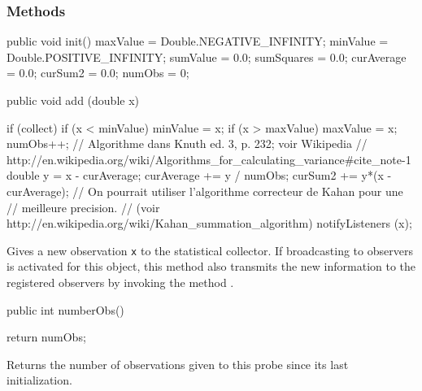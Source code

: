 \subsubsection* {Methods}
\begin{code}\begin{hide}

   public void init() {
       maxValue = Double.NEGATIVE_INFINITY;
       minValue = Double.POSITIVE_INFINITY;
       sumValue = 0.0;
       sumSquares = 0.0;
       curAverage = 0.0;
       curSum2 = 0.0;
       numObs = 0;
   }\end{hide}

   public void add (double x) \begin{hide} {
      if (collect) {
         if (x < minValue) minValue = x;
         if (x > maxValue) maxValue = x;
         numObs++;
         // Algorithme dans Knuth ed. 3, p. 232; voir Wikipedia
         // http://en.wikipedia.org/wiki/Algorithms_for_calculating_variance#cite_note-1
         double y = x - curAverage;
         curAverage += y / numObs;
         curSum2 += y*(x - curAverage);
         // On pourrait utiliser l'algorithme correcteur de Kahan pour une
         // meilleure precision.
         // (voir http://en.wikipedia.org/wiki/Kahan_summation_algorithm)
      }
      notifyListeners (x);
   }\end{hide}
\end{code}
  \begin{tabb}  Gives a new observation \texttt{x} to the statistical collector.
   If broadcasting to observers is activated for this object,
   this method also transmits the new information to the
   registered observers by invoking the method
   .
 \end{tabb}
\begin{htmlonly}
\end{htmlonly}
\begin{code}

   public int numberObs() \begin{hide} {
      return numObs;
   } \end{hide}
\end{code}
  \begin{tabb} Returns the number of observations given to this probe
   since its last initialization.
  \end{tabb}
\begin{htmlonly}
\end{htmlonly}
